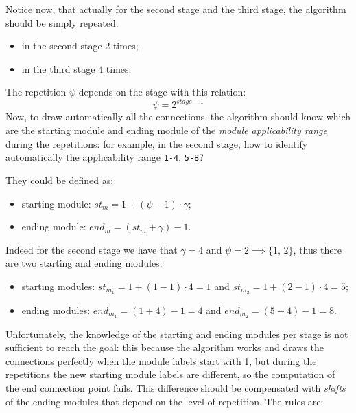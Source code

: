 \documentclass{ltxdoc}
\begin{document}
Notice now, that actually for the second stage and the third stage, the algorithm should be simply repeated:
\begin{itemize}
\item in the second stage 2 times;
\item in the third stage 4 times.
\end{itemize}
The repetition $\psi$ depends on the stage with this relation:
\[\psi= 2^{stage-1}\]
Now, to draw automatically all the connections, the algorithm should know which are the starting module and ending module of the \emph{module applicability range} during the repetitions: for example, in the second stage, how to identify automatically the applicability range \texttt{1-4}, \texttt{5-8}? 
\pagebreak

They could be defined as:
\begin{itemize}
\item starting module: $st_m=1+(\psi-1)\cdot\gamma $;
\item ending module: $end_m=(st_m+\gamma)-1$.
\end{itemize}
Indeed for the second stage we have that $\gamma=4$ and $\psi=2\implies \{1,\, 2\}$, thus there are two starting and ending modules:
\begin{itemize}
\item starting modules: $st_{m_1}=1+(1-1)\cdot 4=1$ and $st_{m_2}=1+(2-1)\cdot 4=5$;
\item ending modules:  $end_{m_1}=(1+4)-1=4$ and $end_{m_2}=(5+4)-1=8$.
\end{itemize}
Unfortunately, the knowledge of the starting and ending modules per stage is not sufficient to reach the goal: this because the algorithm works and draws the connections perfectly when the module labels start with 1, but during the repetitions the new starting module labels are different, so the computation of the end connection point fails. This difference should be compensated with \emph{shifts} of the ending modules that depend on the level of repetition. The rules are:
\end{document}
